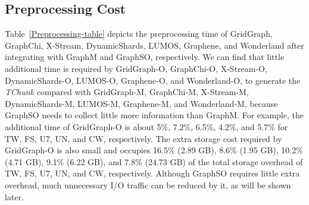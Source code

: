 \documentclass[10pt,journal,compsoc]{IEEEtran}
\begin{document}
\subsection{Preprocessing Cost}
\vspace{-2pt}
Table~\ref{Preprocessing-table} depicts the preprocessing time of GridGraph, GraphChi, X-Stream, DynamicShards, LUMOS, Graphene, and Wonderland after integrating with GraphM and GraphSO, respectively.
We can find that little additional time is required by GridGraph-O, GraphChi-O, X-Stream-O, DynamicShards-O, LUMOS-O, Graphene-O, and Wonderland-O, to generate the \textit{TChunk} compared with GridGraph-M, GraphChi-M, X-Stream-M, DynamicShards-M, LUMOS-M, Graphene-M, and Wonderland-M, because GraphSO needs to collect little more information than GraphM.
For example, the additional time of GridGraph-O is about 5\%, 7.2\%, 6.5\%, 4.2\%, and 5.7\% for TW, FS, U7, UN, and CW, respectively. The extra storage cost required by GridGraph-O is also small and occupies 16.5\% (2.89 GB), 8.6\% (1.95 GB), 10.2\% (4.71 GB),  9.1\% (6.22 GB), and 7.8\% (24.73 GB) of the total storage overhead of TW, FS, U7, UN, and CW, respectively. Although GraphSO requires little extra overhead, much unnecessary I/O traffic can be reduced by it, as will be shown later.
\end{document}
